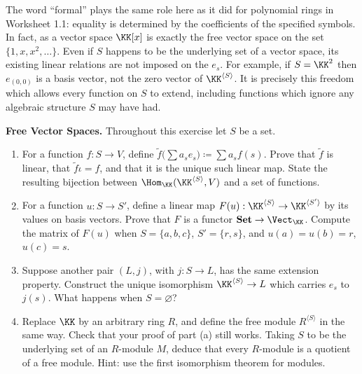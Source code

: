 \documentclass[12pt,reqno]{amsart}
\begin{document}
The word ``formal'' plays the same role here as it did for polynomial rings in Worksheet 1.1: equality is determined by the coefficients of the specified symbols. In fact, as a vector space $\KK[x]$ is exactly the free vector space on the set $\{1,x,x^2,\ldots\}$. Even if $S$ happens to be the underlying set of a vector space, its existing linear relations are not imposed on the $e_s$. For example, if $S=\KK^2$ then $e_{(0,0)}$ is a basis vector, not the zero vector of $\KK^{\langle S\rangle}$. It is precisely this freedom which allows every function on $S$ to extend, including functions which ignore any algebraic structure $S$ may have had.

\hrulefill

\begin{problems}
\item\label{c:free} \textbf{Free Vector Spaces.} Throughout this exercise let $S$ be a set.
\begin{enumerate}
\item For a function $f:S\to V$, define $\widetilde f\big(\sum a_se_s\big)\coloneqq\sum a_sf(s)$. Prove that $\widetilde f$ is linear, that $\widetilde f\iota=f$, and that it is the unique such linear map. State the resulting bijection between $\Hom_{\KK}(\KK^{\langle S\rangle},V)$ and a set of functions.
\item For a function $u:S\to S'$, define a linear map $F(u):\KK^{\langle S\rangle}\to\KK^{\langle S'\rangle}$ by its values on basis vectors. Prove that $F$ is a functor $\mathbf{Set}\to\Vect_{\KK}$. Compute the matrix of $F(u)$ when $S=\{a,b,c\}$, $S'=\{r,s\}$, and $u(a)=u(b)=r$, $u(c)=s$.
\item Suppose another pair $(L,j)$, with $j:S\to L$, has the same extension property. Construct the unique isomorphism $\KK^{\langle S\rangle}\to L$ which carries $e_s$ to $j(s)$. What happens when $S=\varnothing$?
\item Replace $\KK$ by an arbitrary ring $R$, and define the free module $R^{\langle S\rangle}$ in the same way. Check that your proof of part (a) still works. Taking $S$ to be the underlying set of an $R$-module $M$, deduce that every $R$-module is a quotient of a free module. Hint: use the first isomorphism theorem for modules.
\end{enumerate}
\end{problems}

\hrulefill
\end{document}
